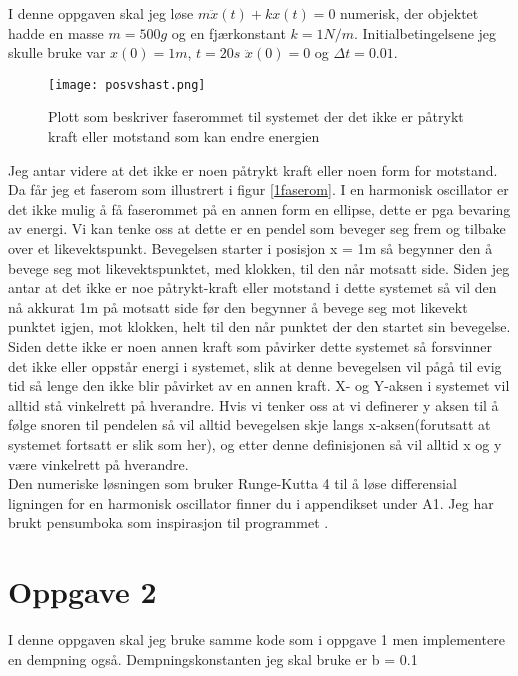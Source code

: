 \documentclass[norsk,a4paper,12pt]{article}
\begin{document}
I denne oppgaven skal jeg løse $m\ddot{x}(t) + kx(t) = 0$ numerisk, der objektet hadde en masse $m= 500g$ og en fjærkonstant $k = 1 N/m$. Initialbetingelsene jeg skulle bruke var $x(0) = 1m$, $t = 20s$ $\ddot{x}(0) = 0$ og $\Delta t =0.01$. 
\begin{wrapfigure}{r}{0.6\textwidth}
	\begin{center}
	\texttt{[image: posvshast.png]}
	\end{center}
	\caption[Faserommet til systemet uten påtrykt kraft eller motstand]{Plott som beskriver faserommet til systemet der det ikke er påtrykt kraft eller motstand som kan endre energien}
	\label{1faserom}
\end{wrapfigure}
Jeg antar videre at det ikke er noen påtrykt kraft eller noen form for motstand. Da får jeg et faserom som illustrert i figur \vref{1faserom}. I en harmonisk oscillator er det ikke mulig å få faserommet på en annen form en ellipse, dette er pga bevaring av energi. Vi kan tenke oss at dette er en pendel som beveger seg frem og tilbake over et likevektspunkt. Bevegelsen starter i posisjon x = 1m så begynner den å bevege seg mot likevektspunktet, med klokken, til den når motsatt side. Siden jeg antar at det ikke er noe påtrykt-kraft eller motstand i dette systemet så vil den nå akkurat 1m på motsatt side før den begynner å bevege seg mot likevekt punktet igjen, mot klokken, helt til den når punktet der den startet sin bevegelse. Siden dette ikke er noen annen kraft som påvirker dette systemet så forsvinner det ikke eller oppstår energi i systemet, slik at denne bevegelsen vil pågå til evig tid så lenge den ikke blir påvirket av en annen kraft. X- og Y-aksen i systemet vil alltid stå vinkelrett på hverandre. Hvis vi tenker oss at vi definerer y aksen til å følge snoren til pendelen så vil alltid bevegelsen skje langs x-aksen(forutsatt at systemet fortsatt er slik som her), og etter denne definisjonen så vil alltid x og y være vinkelrett på hverandre. \\

Den numeriske løsningen som bruker Runge-Kutta 4 til å løse differensial ligningen for en harmonisk oscillator finner du i appendikset under A1. Jeg har brukt pensumboka som inspirasjon til programmet \citep[s. 69]{svolger}.

\section{Oppgave 2}
I denne oppgaven skal jeg bruke samme kode som i oppgave 1 men implementere en dempning også. Dempningskonstanten jeg skal bruke er b = 0.1
\end{document}
